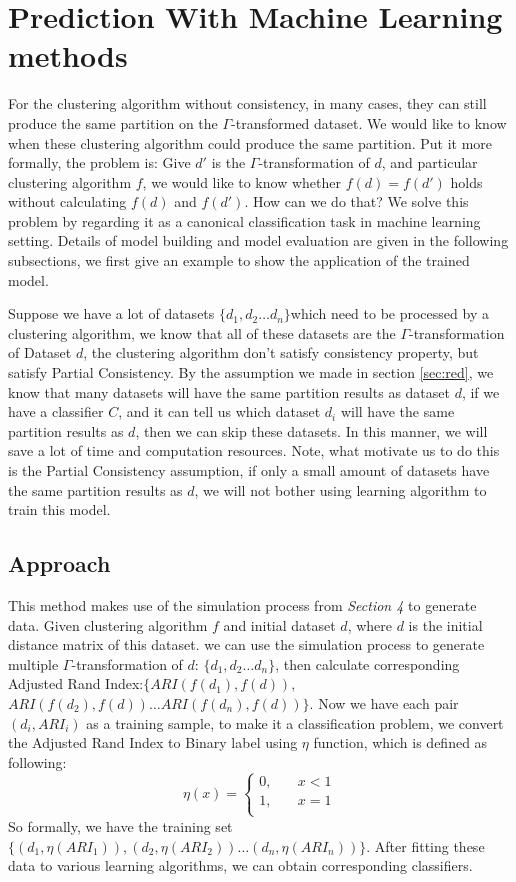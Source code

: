 \documentclass{uonmathreport}
\begin{document}
\section{Prediction With Machine Learning methods} \label{sec:Classification}


For the clustering algorithm without consistency, in many cases, they can still produce the same partition on the $\Gamma$-transformed dataset. We would like to know when these clustering algorithm could produce the same partition. Put it more formally, the problem is: Give $d'$ is the $\Gamma$-transformation of $d$, and particular clustering algorithm $f$, we would like to know whether $f(d)=f(d')$ holds without calculating $f(d)$ and $f(d')$. How can we do that? We solve this problem by regarding it as a canonical classification task in machine learning setting. Details of model building and model evaluation are given in the following subsections, we first give an example to show the application of the trained model.

Suppose we have a lot of datasets $\{d_1,d_2\ldots d_n\}$which need to be processed by a clustering algorithm, we know that all of these datasets are the $\Gamma$-transformation of Dataset $d$, the clustering algorithm don't satisfy consistency property, but satisfy Partial Consistency. By the assumption we made in section \ref{sec:red}, we know that many datasets will have the same  partition results as dataset $d$, if we have a classifier $C$, and it can tell us which dataset $d_i$ will have the same partition results as $d$, then we can skip these datasets. In this manner, we will save a lot of time and computation resources. Note, what motivate us to do this is the Partial Consistency assumption, if only a small amount of datasets have the same partition results as $d$, we will not bother using learning algorithm to train this model.

\subsection{Approach} 
\label{subsec:approach}
This method makes use of the simulation process from \textit{Section 4} to generate data. Given clustering algorithm $f$ and initial dataset $d$, where $d$ is the initial distance matrix of this dataset. we can use the simulation process to generate multiple $\Gamma$-transformation of $d$: $\{d_1,d_2\ldots d_n\}$, then calculate corresponding Adjusted Rand Index:$\{ARI(f(d_1),f(d)),$ $ARI(f(d_2),f(d))
\ldots  ARI(f(d_n),f(d))\}$. Now we have each pair $(d_i,ARI_i)$ as a training sample, to make it a classification problem, we convert the Adjusted Rand Index to Binary label using $\eta$ function, which is defined as following:
\[   
\eta(x) = 
     \begin{cases}
       0, &\quad x<1 \\
       1, &\quad x = 1 \\
     \end{cases}
\]
So formally, we have the training set $\{(d_1,\eta(ARI_1)),(d_2,\eta(ARI_2))\ldots (d_n,\eta(ARI_n))\}$. After fitting these data to various learning algorithms, we can obtain corresponding classifiers. 
\end{document}
